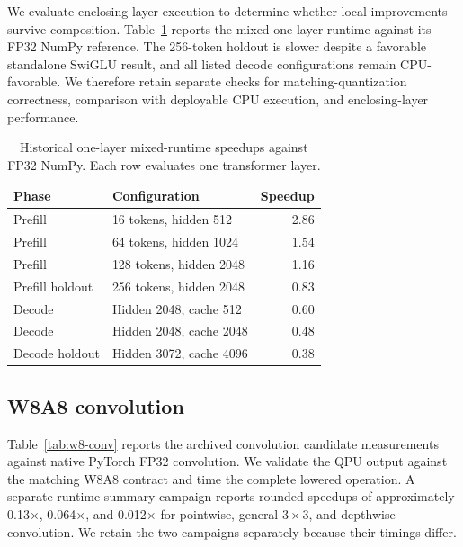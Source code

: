 \documentclass[sigplan,screen,review]{acmart}
\begin{document}
We evaluate enclosing-layer execution to determine whether local improvements survive composition. Table~\ref{tab:w8-layer} reports the mixed one-layer runtime against its FP32 NumPy reference. The 256-token holdout is slower despite a favorable standalone SwiGLU result, and all listed decode configurations remain CPU-favorable. We therefore retain separate checks for matching-quantization correctness, comparison with deployable CPU execution, and enclosing-layer performance.

\begin{table}[t]
\centering
\caption{Historical one-layer mixed-runtime speedups against FP32 NumPy. Each row evaluates one transformer layer.}
\label{tab:w8-layer}
\small
\begin{tabular}{@{}llr@{}}
\toprule
Phase & Configuration & Speedup \\
\midrule
Prefill & 16 tokens, hidden 512 & 2.86 \\
Prefill & 64 tokens, hidden 1024 & 1.54 \\
Prefill & 128 tokens, hidden 2048 & 1.16 \\
Prefill holdout & 256 tokens, hidden 2048 & 0.83 \\
Decode & Hidden 2048, cache 512 & 0.60 \\
Decode & Hidden 2048, cache 2048 & 0.48 \\
Decode holdout & Hidden 3072, cache 4096 & 0.38 \\
\bottomrule
\end{tabular}
\end{table}

\subsection{W8A8 convolution}

Table~\ref{tab:w8-conv} reports the archived convolution candidate measurements against native PyTorch FP32 convolution. We validate the QPU output against the matching W8A8 contract and time the complete lowered operation. A separate runtime-summary campaign reports rounded speedups of approximately 0.13$\times$, 0.064$\times$, and 0.012$\times$ for pointwise, general \(3\times3\), and depthwise convolution. We retain the two campaigns separately because their timings differ.
\end{document}
